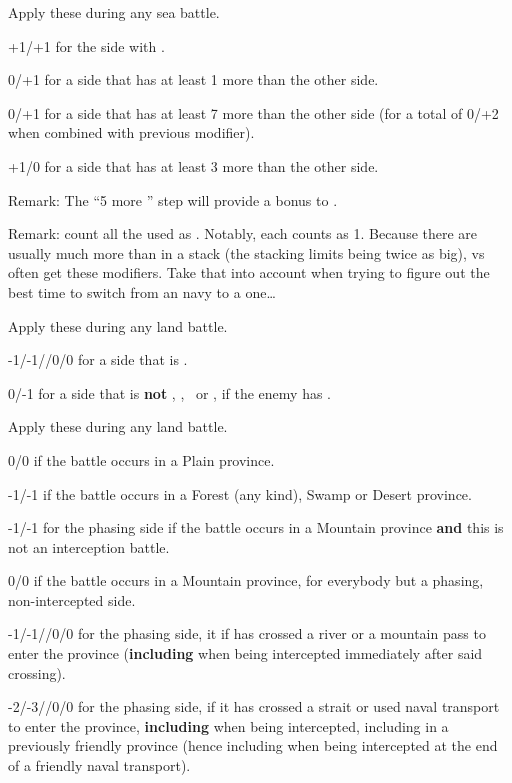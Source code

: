  Apply these during any sea battle.
\begin{modlist}
\item[+1/+1] for the side with .
\item[0/+1] for a side that has at least 1 more \ND than the other side.
\item[0/+1] for a side that has at least 7 more \ND than the other side
  (for a total of 0/+2 when combined with previous modifier).
\item[+1/0] for a side that has at least 3 more \ND than the other side.
\end{modlist}

Remark: The ``5 more \ND'' step will provide a bonus to .

Remark: count all the \ND used as . Notably, each \NGD
counts as 1\ND. Because there are usually much more \NGD than \NWD in a stack
(the stacking limits being twice as big), \NGD vs \NWD often get these
modifiers. Take that into account when trying to figure out the best time to
switch from an \NGD navy to a \NWD one\ldots

 Apply these during any land battle.
\begin{modlist}
\item[-1/-1//0/0] for a side that is .
\item[0/-1] for a side that is \textbf{not} \CAI, \CAIM, \CAII or
  \CAIIM, if the enemy has \TTER.
\end{modlist}

 Apply these during any land battle.
\begin{modlist}
\item[0/0] if the battle occurs in a Plain province.
\item[-1/-1] if the battle occurs in a Forest (any kind), Swamp or
  Desert province.
\item[-1/-1] for the phasing side if the battle occurs in a Mountain
  province \textbf{and} this is not an interception battle.
\item[0/0] if the battle occurs in a Mountain province, for everybody but
  a phasing, non-intercepted side.
\item[-1/-1//0/0] for the phasing side, it if has crossed a river or a
  mountain pass to enter the province (\textbf{including} when being
  intercepted immediately after said crossing).
\item[-2/-3//0/0] for the phasing side, if it has crossed a strait or used
  naval transport to enter the province, \textbf{including} when being
  intercepted, including in a previously friendly province (hence including
  when being intercepted at the end of a friendly naval transport).
\end{modlist}

